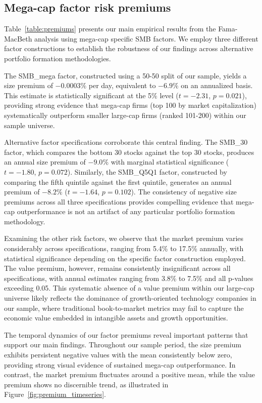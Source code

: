 \documentclass[10pt,letterpaper]{article}
\begin{document}
\subsection*{Mega-cap factor risk premiums}

Table~\ref{table:premiums} presents our main empirical results from the Fama-MacBeth analysis using mega-cap specific SMB factors. We employ three different factor constructions to establish the robustness of our findings across alternative portfolio formation methodologies.

The SMB\_mega factor, constructed using a 50-50 split of our sample, yields a size premium of $-0.0003\%$ per day, equivalent to $-6.9\%$ on an annualized basis. This estimate is statistically significant at the 5\% level ($t=-2.31$, $p=0.021$), providing strong evidence that mega-cap firms (top 100 by market capitalization) systematically outperform smaller large-cap firms (ranked 101-200) within our sample universe.

Alternative factor specifications corroborate this central finding. The SMB\_30 factor, which compares the bottom 30 stocks against the top 30 stocks, produces an annual size premium of $-9.0\%$ with marginal statistical significance ($t=-1.80$, $p=0.072$). Similarly, the SMB\_Q5Q1 factor, constructed by comparing the fifth quintile against the first quintile, generates an annual premium of $-8.2\%$ ($t=-1.64$, $p=0.102$). The consistency of negative size premiums across all three specifications provides compelling evidence that mega-cap outperformance is not an artifact of any particular portfolio formation methodology.

Examining the other risk factors, we observe that the market premium varies considerably across specifications, ranging from 5.4\% to 17.5\% annually, with statistical significance depending on the specific factor construction employed. The value premium, however, remains consistently insignificant across all specifications, with annual estimates ranging from 3.8\% to 7.5\% and all p-values exceeding 0.05. This systematic absence of a value premium within our large-cap universe likely reflects the dominance of growth-oriented technology companies in our sample, where traditional book-to-market metrics may fail to capture the economic value embedded in intangible assets and growth opportunities.

The temporal dynamics of our factor premiums reveal important patterns that support our main findings. Throughout our sample period, the size premium exhibits persistent negative values with the mean consistently below zero, providing strong visual evidence of sustained mega-cap outperformance. In contrast, the market premium fluctuates around a positive mean, while the value premium shows no discernible trend, as illustrated in Figure~\ref{fig:premium_timeseries}.
\end{document}
